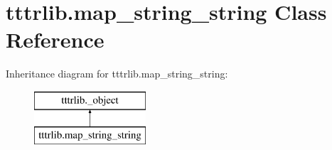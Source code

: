 \hypertarget{classtttrlib_1_1map__string__string}{}\section{tttrlib.\+map\+\_\+string\+\_\+string Class Reference}
\label{classtttrlib_1_1map__string__string}
Inheritance diagram for tttrlib.\+map\+\_\+string\+\_\+string\+:\begin{figure}[H]
\begin{center}
\leavevmode
\includegraphics[height=2.000000cm]{classtttrlib_1_1map__string__string}
\end{center}
\end{figure}
